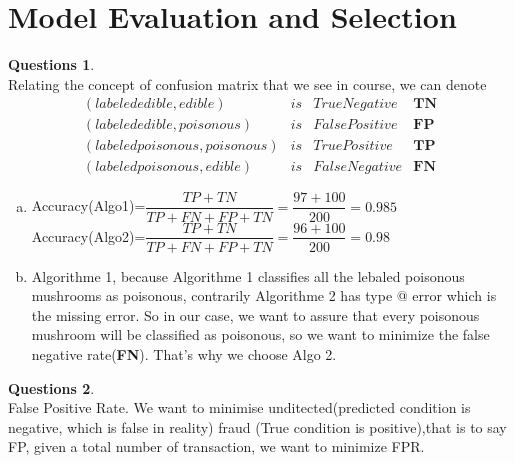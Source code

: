 \documentclass[a4paper,11pt]{article}
\makeatletter
\newcommand{\Rmnum}[1]{\expandafter\@slowromancap\romannumeral #1@}
\theoremstyle{definition}
\newtheorem{quests}{Questions}
\makeatother
\begin{document}
\newpage

\section{Model Evaluation and Selection}
\begin{quests}
\leavevmode\\
Relating the concept of confusion matrix that we see in course, we can denote \\
$$\begin{matrix}
(labeled edible, edible) &is& True Negative & \textbf{TN}\\
(labeled edible, poisonous) &is& False Positive & \textbf{FP}\\
(labeled poisonous, poisonous) &is& True Positive & \textbf{TP}\\
(labeled poisonous, edible) &is& False Negative & \textbf{FN}
\end{matrix}$$
\begin{enumerate}[(a)]
\item Accuracy(Algo1)=$\dfrac{TP+TN}{TP+FN+FP+TN}=\dfrac{97+100}{200}=0.985$\\
Accuracy(Algo2)=$\dfrac{TP+TN}{TP+FN+FP+TN}=\dfrac{96+100}{200}=0.98$
\item Algorithme 1, because Algorithme 1 classifies all the lebaled poisonous mushrooms as poisonous, contrarily Algorithme 2 has type \Rmnum{2} error which is the missing error. So in our case, we want to assure that every poisonous mushroom will be classified as poisonous, so we want to minimize the false negative rate(\textbf{FN}). That's why we choose Algo 2.
\end{enumerate}
\end{quests}

\newpage
\begin{quests}
\leavevmode
\\
False Positive Rate. We want to minimise unditected(predicted condition is negative, which is false in reality) fraud (True condition is positive),that is to say FP, given a total number of transaction, we want to minimize FPR.
\end{quests}
\newpage
\end{document}
